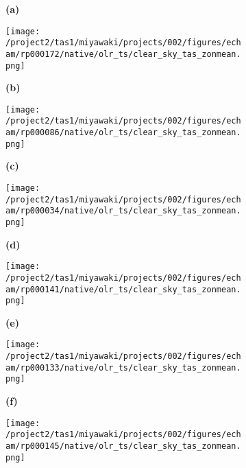 \documentclass[preview]{standalone}
\begin{document}
\begin{figure}
  \begin{subfigure}[t]{0.05\textwidth}
    \textbf{\normalsize{(a)}}
  \end{subfigure}
  \begin{subfigure}[t]{0.45\textwidth}
    \texttt{[image: /project2/tas1/miyawaki/projects/002/figures/echam/rp000172/native/olr\_ts/clear\_sky\_tas\_zonmean.png]}
  \end{subfigure}
  \begin{subfigure}[t]{0.05\textwidth}
    \textbf{\normalsize{(b)}}
  \end{subfigure}
  \begin{subfigure}[t]{0.45\textwidth}
    \texttt{[image: /project2/tas1/miyawaki/projects/002/figures/echam/rp000086/native/olr\_ts/clear\_sky\_tas\_zonmean.png]}
  \end{subfigure}

  \begin{subfigure}[t]{0.05\textwidth}
    \textbf{\normalsize{(c)}}
  \end{subfigure}
  \begin{subfigure}[t]{0.45\textwidth}
    \texttt{[image: /project2/tas1/miyawaki/projects/002/figures/echam/rp000034/native/olr\_ts/clear\_sky\_tas\_zonmean.png]}
  \end{subfigure}
  \begin{subfigure}[t]{0.05\textwidth}
    \textbf{\normalsize{(d)}}
  \end{subfigure}
  \begin{subfigure}[t]{0.45\textwidth}
    \texttt{[image: /project2/tas1/miyawaki/projects/002/figures/echam/rp000141/native/olr\_ts/clear\_sky\_tas\_zonmean.png]}
  \end{subfigure}

  \begin{subfigure}[t]{0.05\textwidth}
    \textbf{\normalsize{(e)}}
  \end{subfigure}
  \begin{subfigure}[t]{0.45\textwidth}
    \texttt{[image: /project2/tas1/miyawaki/projects/002/figures/echam/rp000133/native/olr\_ts/clear\_sky\_tas\_zonmean.png]}
  \end{subfigure}
  \begin{subfigure}[t]{0.05\textwidth}
    \textbf{\normalsize{(f)}}
  \end{subfigure}
  \begin{subfigure}[t]{0.45\textwidth}
    \texttt{[image: /project2/tas1/miyawaki/projects/002/figures/echam/rp000145/native/olr\_ts/clear\_sky\_tas\_zonmean.png]}
  \end{subfigure}


\end{figure}
\end{document}
